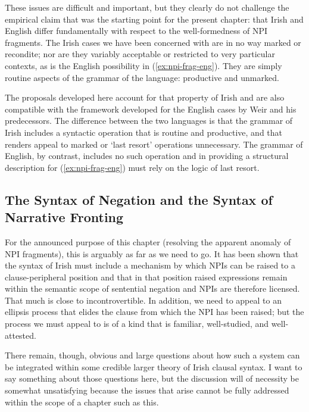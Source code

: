 \documentclass[output=paper,colorlinks,citecolor=brown]{langscibook}
\begin{document}
These issues are difficult and important, but they clearly do not challenge the empirical claim that was the starting point for the present chapter: that Irish and English differ fundamentally with respect to the well-formedness of NPI fragments. The Irish cases we have been concerned with are in no way marked or recondite; nor are they variably acceptable or restricted to very particular contexts, as is the English possibility in (\ref{ex:npi-frag-eng}). They are simply routine aspects of the grammar of the language: productive and unmarked.

The proposals developed here account for that property of Irish and are also compatible with the framework developed for the English cases by Weir and his predecessors. The difference between the two languages is that the grammar of Irish includes a syntactic operation that is routine and productive, and that renders appeal to marked or `last resort' operations unnecessary. The grammar of English, by contrast, includes no such operation and in providing a structural description for (\ref{ex:npi-frag-eng}) must rely on the logic of last resort.

\subsection{The Syntax of Negation and the Syntax of Narrative Fronting}
\label{sec:synneg}

For the announced purpose of this chapter (resolving the apparent anomaly of NPI fragments), this is arguably as far as we need to go. It has been shown that the syntax of Irish must include a mechanism by which NPIs can be raised to a clause-peripheral position and that in that position raised expressions remain within the semantic scope of sentential negation and NPIs are therefore licensed.  That much is close to incontrovertible.  In addition, we need to appeal to an ellipsis process that elides the clause from which the NPI has been raised; but the process we must appeal to is of a kind that is familiar, well-studied, and well-attested.

There remain, though, obvious and large questions about how such a system can be integrated within some credible larger theory of Irish clausal syntax. I want to say something about those questions here, but the discussion will of necessity be somewhat unsatisfying because the issues that arise cannot be fully addressed within the scope of a chapter such as this.
\end{document}
